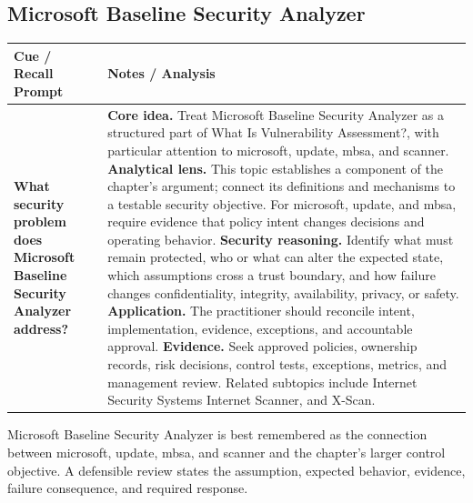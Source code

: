 \documentclass[11pt]{article}
\newcommand{\CornellHeader}{%
\rowcolor{Navy}\color{white}\bfseries Cue / Recall Prompt & \color{white}\bfseries Notes / Analysis\\\hline}
\newcommand{\CornellRow}[2]{%
\cellcolor{CueGray}\RaggedRight\textbf{#1} & \RaggedRight #2\\\hline}
\begin{document}
\subsection*{Microsoft Baseline Security Analyzer}
\begin{longtable}{>{\RaggedRight\arraybackslash}p{}|>{\RaggedRight\arraybackslash}p{}}
\CornellHeader
\CornellRow{What security problem does Microsoft Baseline Security Analyzer address?}{\textbf{Core idea.} Treat Microsoft Baseline Security Analyzer as a structured part of What Is Vulnerability Assessment?, with particular attention to microsoft, update, mbsa, and scanner. \textbf{Analytical lens.} This topic establishes a component of the chapter's argument; connect its definitions and mechanisms to a testable security objective. For microsoft, update, and mbsa, require evidence that policy intent changes decisions and operating behavior. \textbf{Security reasoning.} Identify what must remain protected, who or what can alter the expected state, which assumptions cross a trust boundary, and how failure changes confidentiality, integrity, availability, privacy, or safety. \textbf{Application.} The practitioner should reconcile intent, implementation, evidence, exceptions, and accountable approval. \textbf{Evidence.} Seek approved policies, ownership records, risk decisions, control tests, exceptions, metrics, and management review. Related subtopics include Internet Security Systems Internet Scanner, and X-Scan.}
\end{longtable}
\begin{topicsummary}
Microsoft Baseline Security Analyzer is best remembered as the connection between microsoft, update, mbsa, and scanner and the chapter's larger control objective. A defensible review states the assumption, expected behavior, evidence, failure consequence, and required response.
\end{topicsummary}
\end{document}

